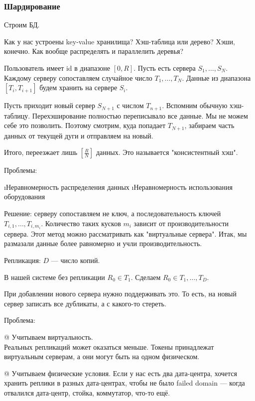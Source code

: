\subsubsection{Шардирование}
Строим БД.

Как у нас устроены key-value хранилища? Хэш-таблица или дерево? Хэши, конечно. Как вообще распределять и параллелить деревья?

Пользователь имеет id в диапазоне $[0, R]$. Пусть есть сервера $S_1, \dots, S_N$. Каждому серверу сопоставляем случайное число $T_1, \dots, T_N$.
Данные из диапазона $[T_i, T_{i+1}]$ будем хранить на сервере $S_i$.

Пусть приходит новый сервер $S_{N+1}$ с числом $T_{n+1}$. Вспомним обычную хэш-таблицу. Перехэширование полностью переписывало все данные. Мы не можем себе это позволить. Поэтому смотрим, куда попадает $T_{N+1}$, забираем часть данных от текущей дуги и отправляем на новый.

Итого, переезжает лишь $[\frac{R}{N}]$ данных.
Это называется "консистентный хэш".

Проблемы: 
\begin{enumerate}
\i Неравномерность распределения данных
\i Неравномерность использования оборудования
\end{enumerate}

Решение: серверу сопоставляем не ключ, а последовательность ключей $T_{i, 1}, \dots, T_{i, m_i}$. Количество таких кусков $m_i$ зависит от производительности сервера. Этот метод можно рассматривать как "виртуальные сервера". Итак, мы размазали данные более равномерно и учли производительность.

Репликация:
$D$ --- число копий.

В нашей системе без репликации $R_0 \in T_1$.
Сделаем $R_0 \in T_1, \dots, T_D$.

При добавлении нового сервера нужно поддерживать это. То есть, на новый сервер записать все дубликаты, а с какого-то стереть.

Проблема:
\begin{el}[ul]
@ Учитываем виртуальность. \\
Реальных репликаций может оказаться меньше. Токены принадлежат виртуальным серверам, а они могут быть на одном физическом.

@ Учитываем физические условия.
Если у нас есть два дата-центра, хочется хранить реплики в разных дата-центрах, чтобы не было failed domain --- когда отвалился дата-центр, стойка, коммутатор, что-то ещё. 
\end{el}

